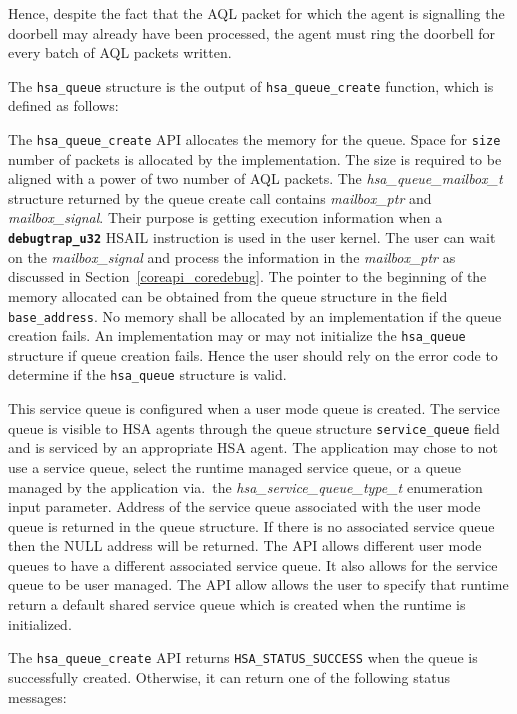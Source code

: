 \documentclass{book}
\newcommand{\diffblock}[1]{#1}
\newcommand{\ttbf}[1]{\diffblock{\texttt{\textbf{#1}}}}
\begin{document}
Hence, despite the fact that the AQL packet for which the agent is
signalling the doorbell may already have been processed, the agent
must ring the doorbell for every batch of AQL packets written.

The \texttt{hsa\_queue} structure is the output of
\texttt{hsa\_queue\_create} function, which is defined as
follows:



The \texttt{hsa\_queue\_create} API allocates the memory for the
queue. Space for \texttt{size} number of packets is allocated by the
implementation. The size is required to be aligned with a power of
two number of AQL packets.
The {\itshape hsa\_queue\_mailbox\_t} structure returned by the
queue create call contains {\itshape mailbox\_ptr} and {\itshape
mailbox\_signal}. Their purpose is getting execution information
when a \ttbf{debugtrap\_u32}
HSAIL instruction is used in the user kernel. The user can wait on
the {\itshape mailbox\_signal} and process the information in the
{\itshape mailbox\_ptr} as discussed in
Section~\ref{coreapi_coredebug}.
The pointer to the beginning of the memory allocated can be obtained
from the queue structure in the field \texttt{base\_address}.  No
memory shall be allocated by an implementation if the queue creation
fails. An implementation may or may not initialize the
\texttt{hsa\_queue} structure if queue creation fails. Hence the
user should rely on the error code to determine if the
\texttt{hsa\_queue} structure is valid.

This service queue is configured when a user mode queue is created.
The service queue is visible to HSA agents through the queue
structure \texttt{service\_queue} field and is serviced by an
appropriate HSA agent. The application may chose to not use a
service queue, select the runtime managed service queue, or a queue
managed by the application via.\ the {\itshape
hsa\_service\_queue\_type\_t} enumeration input parameter.  Address
of the service queue associated with the user mode queue is returned
in the queue structure. If there is no associated service queue then
the NULL address will be returned.  The API allows different user
mode queues to have a different associated service queue. It also
allows for the service queue to be user managed. The API allow
allows the user to specify that runtime return a default shared
service queue which is created when the runtime is initialized.

The \texttt{hsa\_queue\_create} API returns
\texttt{HSA\_STATUS\_SUCCESS} when the queue is successfully
created.  Otherwise, it can return one of the following status
messages:
\end{document}
